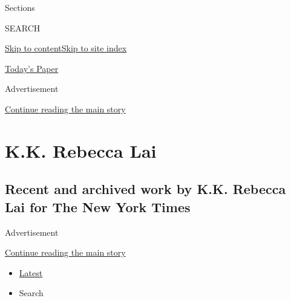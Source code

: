 Sections

SEARCH

\protect\hyperlink{site-content}{Skip to
content}\protect\hyperlink{site-index}{Skip to site index}

\href{https://myaccount.nytimes3xbfgragh.onion/auth/login?response_type=cookie\&client_id=vi}{}

\href{https://www.nytimes3xbfgragh.onion/section/todayspaper}{Today's
Paper}

Advertisement

\protect\hyperlink{after-top}{Continue reading the main story}

\hypertarget{kk-rebecca-lai}{%
\section{K.K. Rebecca Lai}\label{kk-rebecca-lai}}

\hypertarget{recent-and-archived-work-by-kk-rebecca-lai-for-the-new-york-times}{%
\subsection{Recent and archived work by K.K. Rebecca Lai for The New
York
Times}\label{recent-and-archived-work-by-kk-rebecca-lai-for-the-new-york-times}}

Advertisement

\protect\hyperlink{after-mid1}{Continue reading the main story}

\begin{itemize}
\tightlist
\item
  \protect\hyperlink{stream-panel}{Latest}
\item
  Search
\end{itemize}

